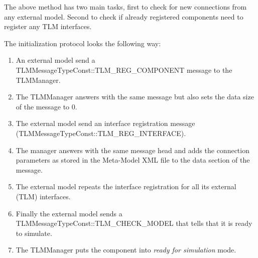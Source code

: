 The above method has two main tasks, first to check for new
connections from any external model. Second to check if already
registered components need to register any TLM interfaces.

The initialization protocol looks the following way:
\begin{enumerate}
\item An external model send a TLMMessageTypeConst::TLM\_REG\_COMPONENT message to the TLMManager.
\item The TLMManager answers with the same message but also sets the data size of the message to 0.
\item The external model send an interface registration message (TLMMessageTypeConst::TLM\_REG\_INTERFACE).
\item The manager answers with the same message head and adds the
  connection parameters as stored in the Meta-Model XML file to the
  data section of the message.
\item The external model repeats the interface registration for all
  its external (TLM) interfaces.
\item Finally the external model sends a
  TLMMessageTypeConst::TLM\_CHECK\_MODEL that tells that it is ready
  to simulate.
\item The TLMManager puts the component into {\em ready for simulation} mode.
\end{enumerate}

